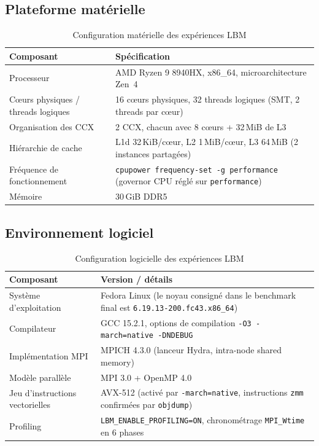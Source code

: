 \documentclass[a4paper,11pt,oneside]{report}
\begin{document}
\subsection{Plateforme matérielle}

\begin{table}[H]
\centering
\caption{Configuration matérielle des expériences LBM}
\label{tab:lbm_hardware}
\begin{tabular}{p{}p{}}
\toprule
\textbf{Composant} & \textbf{Spécification} \\
\midrule
Processeur & AMD Ryzen 9 8940HX, x86\_64, microarchitecture Zen~4 \\
Cœurs physiques / threads logiques & 16 cœurs physiques, 32 threads logiques (SMT, 2 threads par cœur)\\
Organisation des CCX & 2 CCX, chacun avec 8 cœurs + 32\,MiB de L3 \\
Hiérarchie de cache & L1d 32\,KiB/cœur, L2 1\,MiB/cœur, L3 64\,MiB (2 instances partagées)\\
Fréquence de fonctionnement & \texttt{cpupower frequency-set -g performance} (governor CPU réglé sur \texttt{performance})\\
Mémoire & 30\,GiB DDR5 \\
\bottomrule
\end{tabular}
\end{table}

\subsection{Environnement logiciel}

\begin{table}[H]
\centering
\caption{Configuration logicielle des expériences LBM}
\label{tab:lbm_software}
\begin{tabular}{p{}p{}}
\toprule
\textbf{Composant} & \textbf{Version / détails} \\
\midrule
Système d'exploitation & Fedora Linux (le noyau consigné dans le benchmark final est \texttt{6.19.13-200.fc43.x86\_64}) \\
Compilateur & GCC 15.2.1, options de compilation \texttt{-O3 -march=native -DNDEBUG} \\
Implémentation MPI & MPICH 4.3.0 (lanceur Hydra, intra-node shared memory)\\
Modèle parallèle & MPI 3.0 + OpenMP 4.0 \\
Jeu d'instructions vectorielles & AVX-512 (activé par \texttt{-march=native}, instructions \texttt{zmm} confirmées par \texttt{objdump})\\
Profiling & \texttt{LBM\_ENABLE\_PROFILING=ON}, chronométrage \texttt{MPI\_Wtime} en 6 phases \\
\bottomrule
\end{tabular}
\end{table}
\end{document}

